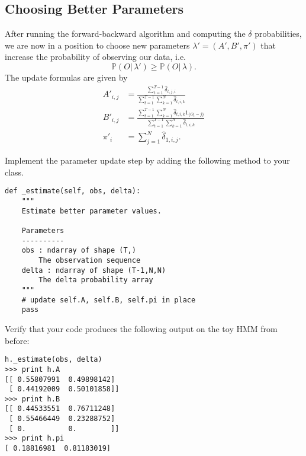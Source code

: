 \subsection*{Choosing Better Parameters}
After running the forward-backward algorithm and computing the $\delta$ probabilities, we are now in a position to choose new parameters $\lambda' = (A', B', \pi')$
that increase the probability of observing our data, i.e.
\[
\mathbb{P}(O|\,\lambda') \geq \mathbb{P}(O|\,\lambda).
\]
The update formulas are given by
\begin{align*}
A'_{i,j} &= \frac{\sum_{t=1}^{T-1}\widehat{\delta}_{t,j,i}}{\sum_{t=1}^{T-1}\sum_{k=1}^N\widehat{\delta}_{t,i,k}}\\
B'_{i,j} &= \frac{\sum_{t=1}^{T-1}\sum_{k=1}^N\widehat{\delta}_{t,i,k}1_{\{O_t=j\}}}{\sum_{t=1}^{T-1}\sum_{k=1}^N\widehat{\delta}_{t,i,k}}\\
\pi'_i &= \sum_{j=1}^N \widehat{\delta}_{1,i,j}.
\end{align*}
\begin{problem}
Implement the parameter update step by adding the following method to your class.
\begin{lstlisting}
def _estimate(self, obs, delta):
    """
    Estimate better parameter values.

    Parameters
    ----------
    obs : ndarray of shape (T,)
        The observation sequence
    delta : ndarray of shape (T-1,N,N)
        The delta probability array
    """
    # update self.A, self.B, self.pi in place
    pass
\end{lstlisting}
Verify that your code produces the following output on the toy HMM from before:
\begin{lstlisting}
h._estimate(obs, delta)
>>> print h.A
[[ 0.55807991  0.49898142]
 [ 0.44192009  0.50101858]]
>>> print h.B
[[ 0.44533551  0.76711248]
 [ 0.55466449  0.23288752]
 [ 0.          0.        ]]
>>> print h.pi
[ 0.18816981  0.81183019]
\end{lstlisting}
\end{problem}

